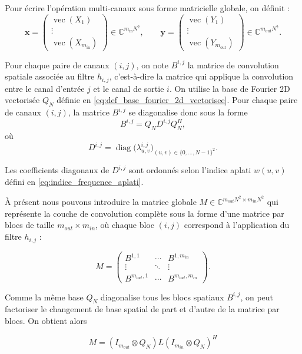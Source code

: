 Pour écrire l'opération multi-canaux sous forme matricielle globale, on définit :
\[
\mathbf{x}
=
\begin{pmatrix}
\operatorname{vec}(X_1) \\
\vdots \\
\operatorname{vec}(X_{m_{\mathrm{in}}})
\end{pmatrix}
\in \mathbb{C}^{m_{\mathrm{in}}N^2},
\qquad
\mathbf{y}
=
\begin{pmatrix}
\operatorname{vec}(Y_1) \\
\vdots \\
\operatorname{vec}(Y_{m_{\mathrm{out}}})
\end{pmatrix}
\in \mathbb{C}^{m_{\mathrm{out}}N^2}.
\]

Pour chaque paire de canaux $(i,j)$, on note $B^{i,j}$ la matrice de convolution spatiale
associée au filtre $h_{i,j}$, c'est-à-dire la matrice qui applique la convolution entre le canal
d'entrée $j$ et le canal de sortie $i$.
On utilise la base de Fourier 2D vectorisée $Q_N$ définie en
\eqref{eq:def_base_fourier_2d_vectorisee}. Pour chaque paire de canaux $(i,j)$, la matrice
$B^{i,j}$ se diagonalise donc sous la forme
\[
    B^{i,j}
    =
    Q_N D^{i,j} Q_N^H,
\]
où
\[
D^{i,j}
=
\operatorname{diag}\bigl(
\lambda^{i,j}_{u,v}
\bigr)_{(u,v)\in\{0,\dots,N-1\}^2}.
\]

Les coefficients diagonaux de $D^{i,j}$ sont ordonnés selon l'indice aplati
$w(u,v)$ défini en \eqref{eq:indice_frequence_aplati}.

À présent nous pouvons introduire la matrice globale $M \in \mathbb{C}^{m_{out}N^2 \times m_{in}N^2}$
qui représente la couche de convolution complète sous la forme d'une matrice par blocs de taille
$m_{out} \times m_{in}$, où chaque bloc $(i,j)$ correspond à l'application du filtre $h_{i,j}$ :

$$
M =
\begin{pmatrix}
B^{1,1} & \cdots & B^{1,m_{in}} \\
\vdots & \ddots & \vdots \\
B^{m_{out},1} & \cdots & B^{m_{out},m_{in}}
\end{pmatrix}.
$$

Comme la même base $Q_N$ diagonalise tous les blocs spatiaux $B^{i,j}$, on peut factoriser le changement
de base spatial de part et d'autre de la matrice par blocs. On obtient alors

\begin{equation}
    M = (I_{m_{out}} \otimes Q_N) L (I_{m_{in}} \otimes Q_N)^H
    \label{eq:factorisation_M}
\end{equation}


